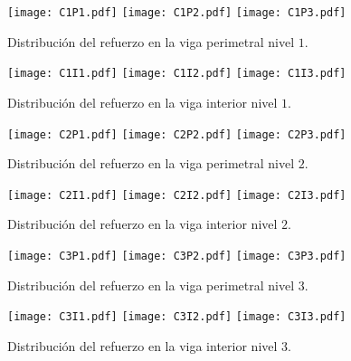 \newpage

\begin{figure}[htbp]
\centering
			\texttt{[image: C1P1.pdf]}
			\texttt{[image: C1P2.pdf]}
			\texttt{[image: C1P3.pdf]}
	\caption{Distribuci\'on del refuerzo en la viga perimetral nivel $1$.}
	\label{fig:apendis11}
\end{figure}

\newpage

\begin{figure}[htbp]
\centering
			\texttt{[image: C1I1.pdf]}
			\texttt{[image: C1I2.pdf]}
			\texttt{[image: C1I3.pdf]}
	\caption{Distribuci\'on del refuerzo en la viga interior nivel $1$.}
	\label{fig:apendis12}
\end{figure}

\newpage

\begin{figure}[htbp]
\centering
			\texttt{[image: C2P1.pdf]}
			\texttt{[image: C2P2.pdf]}
			\texttt{[image: C2P3.pdf]}						
	\caption{Distribuci\'on del refuerzo en la viga perimetral nivel $2$.}
	\label{fig:apendis13}
\end{figure}

\newpage

\begin{figure}[htbp]
\centering
			\texttt{[image: C2I1.pdf]}
			\texttt{[image: C2I2.pdf]}
			\texttt{[image: C2I3.pdf]}						
	\caption{Distribuci\'on del refuerzo en la viga interior nivel $2$.}
	\label{fig:apendis14}
\end{figure}

\newpage

\begin{figure}[htbp]
\centering
			\texttt{[image: C3P1.pdf]}
			\texttt{[image: C3P2.pdf]}
			\texttt{[image: C3P3.pdf]}						
	\caption{Distribuci\'on del refuerzo en la viga perimetral nivel $3$.}
	\label{fig:apendis15}
\end{figure}

\newpage

\begin{figure}[htbp]
\centering
			\texttt{[image: C3I1.pdf]}
			\texttt{[image: C3I2.pdf]}
			\texttt{[image: C3I3.pdf]}						
	\caption{Distribuci\'on del refuerzo en la viga interior nivel $3$.}
	\label{fig:apendis16}
\end{figure}

